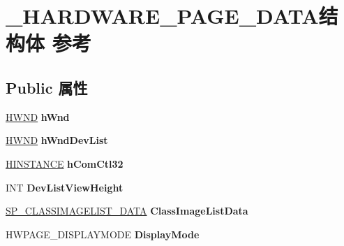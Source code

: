 \hypertarget{struct___h_a_r_d_w_a_r_e___p_a_g_e___d_a_t_a}{}\section{\+\_\+\+H\+A\+R\+D\+W\+A\+R\+E\+\_\+\+P\+A\+G\+E\+\_\+\+D\+A\+T\+A结构体 参考}
\label{struct___h_a_r_d_w_a_r_e___p_a_g_e___d_a_t_a}
\subsection*{Public 属性}
\begin{DoxyCompactItemize}
\item 
\mbox{\label{struct___h_a_r_d_w_a_r_e___p_a_g_e___d_a_t_a_a9fee182b77dd084ea6295ec93aa6b32f}} 
\hyperlink{interfacevoid}{H\+W\+ND} {\bfseries h\+Wnd}
\item 
\mbox{\label{struct___h_a_r_d_w_a_r_e___p_a_g_e___d_a_t_a_a5e7e57f401e55e94595ef3be7622ebc5}} 
\hyperlink{interfacevoid}{H\+W\+ND} {\bfseries h\+Wnd\+Dev\+List}
\item 
\mbox{\label{struct___h_a_r_d_w_a_r_e___p_a_g_e___d_a_t_a_a9d9df164657f35195b91f03d1163a808}} 
\hyperlink{interfacevoid}{H\+I\+N\+S\+T\+A\+N\+CE} {\bfseries h\+Com\+Ctl32}
\item 
\mbox{\label{struct___h_a_r_d_w_a_r_e___p_a_g_e___d_a_t_a_a35dbb8caae9f91e5bf1f2d3a292c3e61}} 
I\+NT {\bfseries Dev\+List\+View\+Height}
\item 
\mbox{\label{struct___h_a_r_d_w_a_r_e___p_a_g_e___d_a_t_a_a12fee3aec893732cfb22c15a53525894}} 
\hyperlink{struct___s_p___c_l_a_s_s_i_m_a_g_e_l_i_s_t___d_a_t_a}{S\+P\+\_\+\+C\+L\+A\+S\+S\+I\+M\+A\+G\+E\+L\+I\+S\+T\+\_\+\+D\+A\+TA} {\bfseries Class\+Image\+List\+Data}
\item 
\mbox{\label{struct___h_a_r_d_w_a_r_e___p_a_g_e___d_a_t_a_af7dfd951bb465e1c34ed2d973319fbe9}} 
H\+W\+P\+A\+G\+E\+\_\+\+D\+I\+S\+P\+L\+A\+Y\+M\+O\+DE {\bfseries Display\+Mode}

\end{DoxyCompactItemize}
